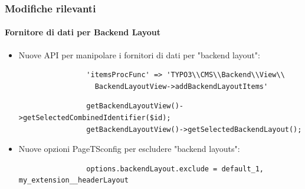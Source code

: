 \begin{frame}[fragile]
	\frametitle{Modifiche rilevanti}
	\framesubtitle{Fornitore di dati per Backend Layout}

	\begin{itemize}
		\item Nuove API per manipolare i fornitori di dati per "backend layout":

			\begin{lstlisting}
				'itemsProcFunc' => 'TYPO3\\CMS\\Backend\\View\\
				  BackendLayoutView->addBackendLayoutItems'
			\end{lstlisting}

			\begin{lstlisting}
				getBackendLayoutView()->getSelectedCombinedIdentifier($id);
				getBackendLayoutView()->getSelectedBackendLayout();
			\end{lstlisting}

		\item Nuove opzioni PageTSconfig per escludere "backend layouts":

			\begin{lstlisting}
				options.backendLayout.exclude = default_1, my_extension__headerLayout
			\end{lstlisting}

	\end{itemize}

\end{frame}


